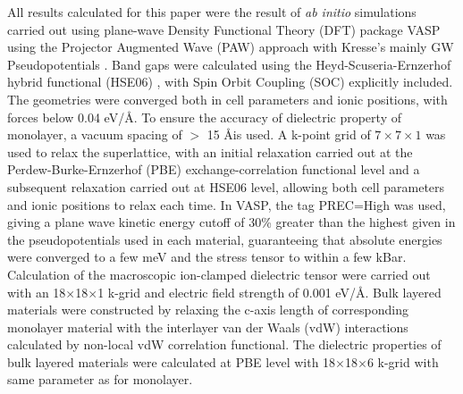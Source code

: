 \documentclass[journal=ancac3,manuscript=article,email=true,hyperref=true,keywords=false]{achemso}
\begin{document}
All results calculated for this paper were the result of \emph{ab
  initio} simulations carried out using plane-wave Density Functional
Theory (DFT) package VASP
\cite{Kresse_1993,Kresse_1996_1,Kresse_1996_2} using the Projector
Augmented Wave (PAW) approach with Kresse’s mainly GW
Pseudopotentials \cite{Kresse_1999_pseudopotentials}. Band gaps were
calculated using the Heyd-Scuseria-Ernzerhof hybrid functional (HSE06)
\cite{Heyd_2003,HSE_2006}, with Spin Orbit Coupling (SOC) explicitly
included. The geometries were converged both in cell parameters and
ionic positions, with forces below 0.04 eV/\AA. To ensure the accuracy
of dielectric property of monolayer, a vacuum spacing of $>$ 15 \AA is
used. A k-point grid of \(7\times7\times1\) was used to relax the
superlattice, with an initial relaxation carried out at the
Perdew-Burke-Ernzerhof
(PBE)\cite{Perdew_1996,Ernzerhof_1999,Paier_2005_PBE}
exchange-correlation functional level and a subsequent relaxation
carried out at HSE06 level, allowing both cell parameters and ionic
positions to relax each time. In VASP, the tag PREC=High was used,
giving a plane wave kinetic energy cutoff of 30\% greater than the
highest given in the pseudopotentials used in each material,
guaranteeing that absolute energies were converged to a few meV and
the stress tensor to within a few kBar.  Calculation of the
macroscopic ion-clamped dielectric tensor were carried out with an
18$\times$18$\times$1 k-grid and electric field strength of 0.001
eV/\AA. Bulk layered materials were constructed by relaxing the c-axis
length of corresponding monolayer material with the interlayer van der
Waals (vdW) interactions calculated by non-local vdW correlation
functional\cite{Lee_2010_vdFD2}. The dielectric properties of bulk
layered materials were calculated at PBE level with
18$\times$18$\times$6 k-grid with same parameter as for monolayer.




\end{document}

